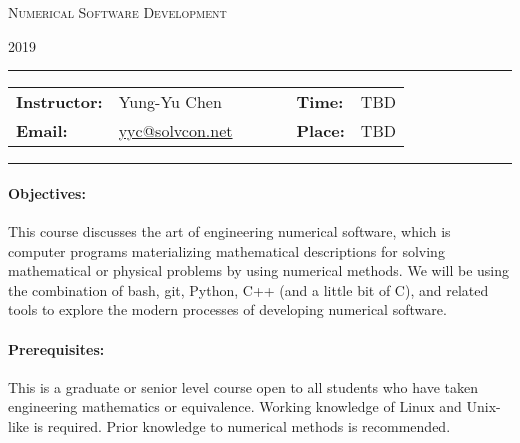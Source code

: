 \documentclass[11pt,a4paper]{article}
\begin{document}
\begin{center}
{\Large \textsc{Numerical Software Development}}
\end{center}
\begin{center}
2019
\end{center}

\begin{center}
\rule{6in}{0.4pt}
\begin{minipage}[t]{.75\textwidth}
\begin{tabular}{llcccll}
\textbf{Instructor:} & Yung-Yu Chen & & &  &
\textbf{Time:} & TBD \\
\textbf{Email:} & \href{mailto:yyc@solvcon.net}{yyc@solvcon.net} & & & &
\textbf{Place:} & TBD
\end{tabular}
\end{minipage}
\rule{6in}{0.4pt}
\end{center}



\paragraph{Objectives:}

This course discusses the art of engineering numerical software, which is
computer programs materializing mathematical descriptions for solving
mathematical or physical problems by using numerical methods.  We will be using
the combination of bash, git, Python, C++ (and a little bit of C), and related
tools to explore the modern processes of developing numerical software.

\paragraph{Prerequisites:}

This is a graduate or senior level course open to all students who have taken
engineering mathematics or equivalence.  Working knowledge of Linux and
Unix-like is required.  Prior knowledge to numerical methods is recommended.
\end{document}
